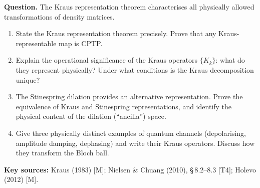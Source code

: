 \documentclass[11pt,a4paper]{article}
\begin{document}
\begin{tcolorbox}[researchbox, title={WRQ 3 --- Mathematical: Quantum Channels and the Kraus Representation}]

\textbf{Question.}
The Kraus representation theorem characterises all physically allowed
transformations of density matrices.

\begin{enumerate}[leftmargin=1.8em, label=(\alph*), itemsep=6pt]
  \item State the Kraus representation theorem precisely.
        Prove that any Kraus-representable map is CPTP.
  \item Explain the operational significance of the Kraus operators $\{K_k\}$:
        what do they represent physically? Under what conditions is the
        Kraus decomposition unique?
  \item The Stinespring dilation provides an alternative representation.
        Prove the equivalence of Kraus and Stinespring representations,
        and identify the physical content of the dilation (``ancilla'') space.
  \item Give three physically distinct examples of quantum channels (depolarising,
        amplitude damping, dephasing) and write their Kraus operators.
        Discuss how they transform the Bloch ball.
\end{enumerate}

\medskip\textbf{Key sources:} Kraus (1983) [M]; Nielsen \& Chuang (2010), \S\,8.2--8.3 [T4];
Holevo (2012) [M].
\end{tcolorbox}

\bigskip
\end{document}
